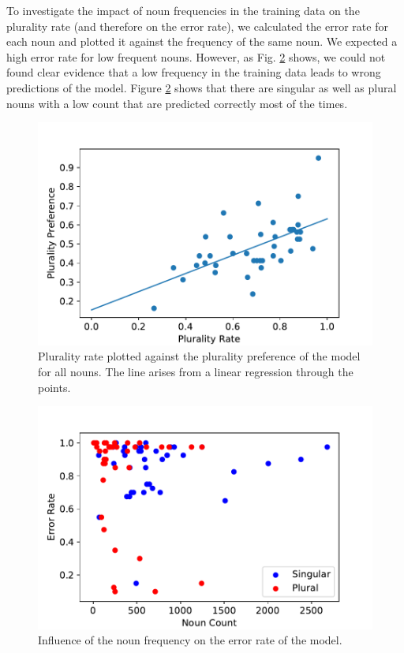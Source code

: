 To investigate the impact of noun frequencies in the training data on the plurality rate (and therefore on the error rate), we calculated the error rate for each noun and plotted it against the frequency of the same noun. We expected a high error rate for low frequent nouns. However, as Fig. \ref{fig:noun_freq_error} shows, we could not found clear evidence that a low frequency in the training data leads to wrong predictions of the model. Figure \ref{fig:noun_freq_error} shows that there are singular as well as plural nouns with a low count that are predicted correctly most of the times.

 
     \begin{figure}
     \centering
        \includegraphics[scale=0.5]{lin_reg.pdf}
        \caption{Plurality rate plotted against the plurality preference of the model for all nouns. The line arises from a linear regression through the points. }
        \label{fig:lin_reg}
    \end{figure}
         \begin{figure}
          \centering
        \includegraphics[scale=0.5]{noun_freq_error_rate.pdf}
        \caption{Influence of the noun frequency on the error rate of the model.}
        \label{fig:noun_freq_error}
    \end{figure}
    
